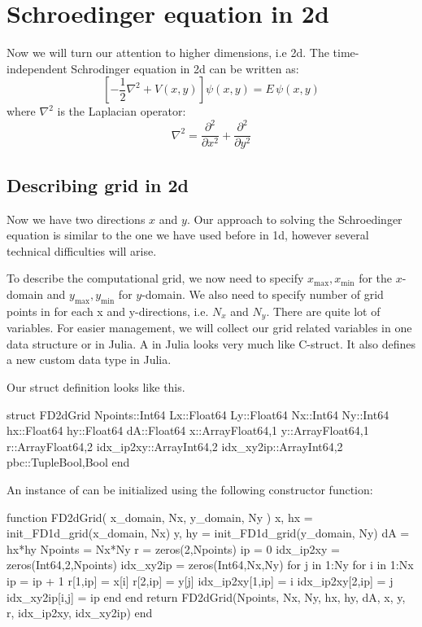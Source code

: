 \chapter{Schroedinger equation in 2d}

Now we will turn our attention to higher dimensions, i.e 2d.
The time-independent Schrodinger equation in 2d can be written as:
\begin{equation}
\left[ -\frac{1}{2}\nabla^2 + V(x,y) \right] \psi(x,y) = E\,\psi(x,y)
\label{eq:sch_2d}
\end{equation}
%
where $\nabla^2$ is the Laplacian operator:
%
\begin{equation}
\nabla^2 = \frac{\partial^2}{\partial x^2} + \frac{\partial^2}{\partial y^2}
\end{equation}



\section{Describing grid in 2d}

Now we have two directions $x$ and $y$. Our approach to solving the Schroedinger equation
is similar to the one we have used before in 1d, however several technical difficulties
will arise.

To describe the computational grid, we now need to specify
$x_{\mathrm{max}}, x_{\mathrm{min}}$ for the $x$-domain
and $y_{\mathrm{max}}, y_{\mathrm{min}}$ for $y$-domain. We also need to specify number of grid
points in for each x and y-directions, i.e. $N_{x}$ and $N_{y}$.
There are quite lot of variables.
For easier management, we will collect our grid related variables in one data structure or
 in Julia. A  in Julia looks very much like C-struct.
It also defines a new custom data type in Julia.

Our struct definition looks like this.
\begin{juliacode}
struct FD2dGrid
  Npoints::Int64
  Lx::Float64
  Ly::Float64
  Nx::Int64
  Ny::Int64
  hx::Float64
  hy::Float64
  dA::Float64
  x::Array{Float64,1}
  y::Array{Float64,1}
  r::Array{Float64,2}
  idx_ip2xy::Array{Int64,2}
  idx_xy2ip::Array{Int64,2}
  pbc::Tuple{Bool,Bool}
end
\end{juliacode}
%
An instance of  can be initialized using the following constructor function:
%
\begin{juliacode}
function FD2dGrid( x_domain, Nx, y_domain, Ny )
  x, hx = init_FD1d_grid(x_domain, Nx)
  y, hy = init_FD1d_grid(y_domain, Ny)
  dA = hx*hy
  Npoints = Nx*Ny
  r = zeros(2,Npoints)
  ip = 0
  idx_ip2xy = zeros(Int64,2,Npoints)
  idx_xy2ip = zeros(Int64,Nx,Ny)
  for j in 1:Ny
    for i in 1:Nx
      ip = ip + 1
      r[1,ip] = x[i]
      r[2,ip] = y[j]
      idx_ip2xy[1,ip] = i
      idx_ip2xy[2,ip] = j
      idx_xy2ip[i,j] = ip
    end
  end
  return FD2dGrid(Npoints, Nx, Ny, hx, hy, dA, x, y, r, idx_ip2xy, idx_xy2ip) 
end
\end{juliacode}

